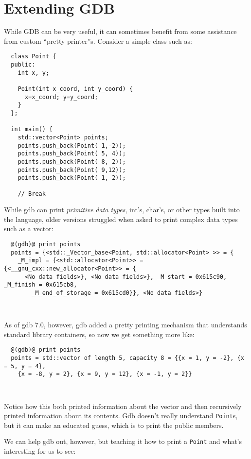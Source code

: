 \documentclass{article}
\begin{document}
\newpage
\section{Extending GDB}
While GDB can be very useful, it can sometimes benefit from some assistance
from custom ``pretty printer''s. Consider a simple class such as:

\begin{lstlisting}
  class Point {
  public:
    int x, y;

    Point(int x_coord, int y_coord) {
      x=x_coord; y=y_coord;
    }
  };

  int main() {
    std::vector<Point> points;
    points.push_back(Point( 1,-2));
    points.push_back(Point( 5, 4));
    points.push_back(Point(-8, 2));
    points.push_back(Point( 9,12));
    points.push_back(Point(-1, 2));

    // Break
\end{lstlisting}

While gdb can print \emph{primitive data types}, int's, char's, or other
types built into the language, older versions struggled when asked to print
complex data types such as a vector:

\begin{lstlisting}
  @(gdb)@ print points
  points = {<std::_Vector_base<Point, std::allocator<Point> >> = {
    _M_impl = {<std::allocator<Point>> = {<__gnu_cxx::new_allocator<Point>> = {
      <No data fields>}, <No data fields>}, _M_start = 0x615c90, _M_finish = 0x615cb8,
        _M_end_of_storage = 0x615cd0}}, <No data fields>}
\end{lstlisting}
~

As of gdb 7.0, however, gdb added a pretty printing mechanism that understands
standard library containers, so now we get something more like:

\begin{lstlisting}
  @(gdb)@ print points
  points = std::vector of length 5, capacity 8 = {{x = 1, y = -2}, {x = 5, y = 4},
    {x = -8, y = 2}, {x = 9, y = 12}, {x = -1, y = 2}}
\end{lstlisting}
~

Notice how this both printed information about the vector and then recursively
printed information about its contents. Gdb doesn't really understand
\texttt{Point}s, but it can make an educated guess, which is to print the
public members.

We can help gdb out, however, but teaching it how to print a \texttt{Point}
and what's interesting for us to see:
\end{document}
